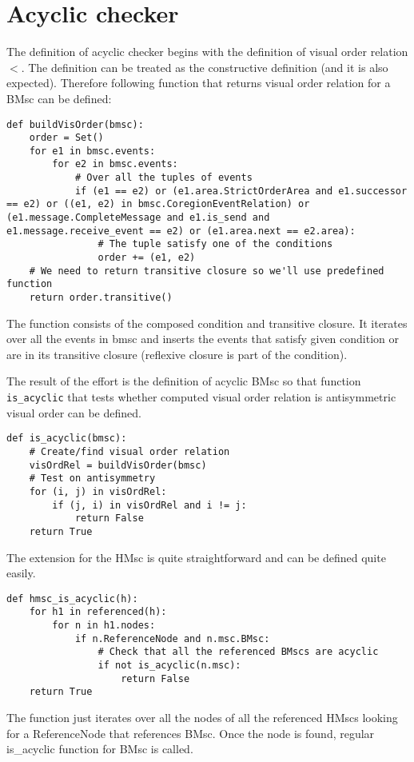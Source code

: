 \documentclass[11pt,oneside]{fithesis2}
\newcommand{\T}[1]{\texttt{#1}}
\begin{document}
\section{Acyclic checker}
The definition of acyclic checker begins with the definition of visual order relation $<$. The definition can be treated as the constructive definition (and it is also expected). Therefore following function that returns visual order relation for a BMsc can be defined:
\begin{lstlisting}
def buildVisOrder(bmsc):
    order = Set()
    for e1 in bmsc.events:
        for e2 in bmsc.events:
            # Over all the tuples of events
            if (e1 == e2) or (e1.area.StrictOrderArea and e1.successor == e2) or ((e1, e2) in bmsc.CoregionEventRelation) or (e1.message.CompleteMessage and e1.is_send and e1.message.receive_event == e2) or (e1.area.next == e2.area):
                # The tuple satisfy one of the conditions
                order += (e1, e2)
    # We need to return transitive closure so we'll use predefined function
    return order.transitive()
\end{lstlisting}
The function consists of the composed condition and transitive closure. It iterates over all the events in bmsc and inserts the events that satisfy given condition or are in its transitive closure (reflexive closure is part of the condition).

The result of the effort is the definition of acyclic BMsc so that function \T{is\_acyclic} that tests whether computed visual order relation is antisymmetric visual order can be defined. 
\begin{lstlisting}
def is_acyclic(bmsc):
    # Create/find visual order relation
    visOrdRel = buildVisOrder(bmsc)
    # Test on antisymmetry
    for (i, j) in visOrdRel:
        if (j, i) in visOrdRel and i != j:
            return False
    return True
\end{lstlisting}

The extension for the HMsc is quite straightforward and can be defined quite easily.
\begin{lstlisting}
def hmsc_is_acyclic(h):
    for h1 in referenced(h):
        for n in h1.nodes:
            if n.ReferenceNode and n.msc.BMsc:
                # Check that all the referenced BMscs are acyclic
                if not is_acyclic(n.msc):
                    return False
    return True
\end{lstlisting}

The function just iterates over all the nodes of all the referenced HMscs looking for a ReferenceNode that references BMsc. Once the node is found, regular is\_acyclic function for BMsc is called.
\end{document}
